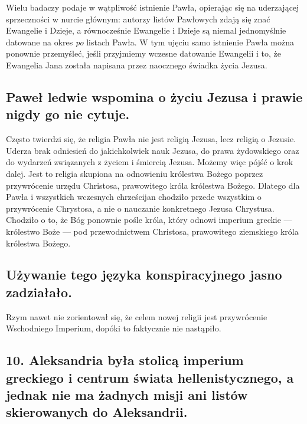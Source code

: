 Wielu badaczy podaje w wątpliwość istnienie Pawła, opierając się na uderzającej sprzeczności w nurcie głównym: autorzy listów Pawłowych zdają się znać Ewangelie i Dzieje, a równocześnie Ewangelie i Dzieje są niemal jednomyślnie datowane na okres \emph{po} listach Pawła.
W tym ujęciu samo istnienie Pawła można ponownie przemyśleć, jeśli przyjmiemy wczesne datowanie Ewangelii i to, że Ewangelia Jana została napisana przez naocznego świadka życia Jezusa.

\subsection{Paweł ledwie wspomina o życiu Jezusa i prawie nigdy go nie cytuje.}\label{subsec:paul-barely-mentions-the-life-of-jesus-and-almost-never-quotes-him.}

Często twierdzi się, że religia Pawła nie jest religią Jezusa, lecz religią o Jezusie.
Uderza brak odniesień do jakichkolwiek nauk Jezusa, do prawa żydowskiego oraz do wydarzeń związanych z życiem i śmiercią Jezusa.
Możemy więc pójść o krok dalej.
Jest to religia skupiona na odnowieniu królestwa Bożego poprzez przywrócenie urzędu Christosa, prawowitego króla królestwa Bożego.
Dlatego dla Pawła i wszystkich wczesnych chrześcijan chodziło przede wszystkim o przywrócenie Chrystosa, a nie o nauczanie konkretnego Jezusa Chrystusa.
Chodziło o to, że Bóg ponownie pośle króla, który odnowi imperium greckie — królestwo Boże — pod przewodnictwem Christosa, prawowitego ziemskiego króla królestwa Bożego.

\subsection{Używanie tego języka konspiracyjnego jasno zadziałało.}\label{subsec:using-this-conspiratorial-language-clearly-worked}

Rzym nawet nie zorientował się, że celem nowej religii jest przywrócenie Wschodniego Imperium, dopóki to faktycznie nie nastąpiło.

\subsection{10.
Aleksandria była stolicą imperium greckiego i centrum świata hellenistycznego, a jednak nie ma żadnych misji ani listów skierowanych do Aleksandrii.}

\label{subsec:alexandria-was-the-capital-of-the-greek-empire-and-the-center-of-the-hellenistic-world-and-yet-there-are-no-missions-or-letters-to-alexandria.}

